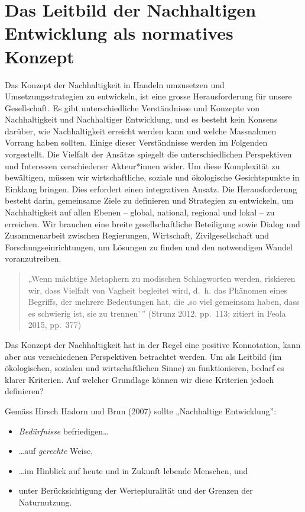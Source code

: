 \documentclass[
  nswissgerman,
  a4paper,
  openany]{book}
\providecommand{\tightlist}{%
  \setlength{\itemsep}{0pt}\setlength{\parskip}{0pt}}
\begin{document}
\section{Das Leitbild der Nachhaltigen Entwicklung als normatives
Konzept}\label{das-leitbild-der-nachhaltigen-entwicklung-als-normatives-konzept}

Das Konzept der Nachhaltigkeit in Handeln umzusetzen und
Umsetzungsstrategien zu entwickeln, ist eine grosse Herausforderung für
unsere Gesellschaft. Es gibt unterschiedliche Verständnisse und Konzepte
von Nachhaltigkeit und Nachhaltiger Entwicklung, und es besteht kein
Konsens darüber, wie Nachhaltigkeit erreicht werden kann und welche
Massnahmen Vorrang haben sollten. Einige dieser Verständnisse werden im
Folgenden vorgestellt. Die Vielfalt der Ansätze spiegelt die
unterschiedlichen Perspektiven und Interessen verschiedener Akteur*innen
wider. Um diese Komplexität zu bewältigen, müssen wir wirtschaftliche,
soziale und ökologische Gesichtspunkte in Einklang bringen. Dies
erfordert einen integrativen Ansatz. Die Herausforderung besteht darin,
gemeinsame Ziele zu definieren und Strategien zu entwickeln, um
Nachhaltigkeit auf allen Ebenen -- global, national, regional und lokal
-- zu erreichen. Wir brauchen eine breite gesellschaftliche Beteiligung
sowie Dialog und Zusammenarbeit zwischen Regierungen, Wirtschaft,
Zivilgesellschaft und Forschungseinrichtungen, um Lösungen zu finden und
den notwendigen Wandel voranzutreiben.

\begin{quote}
„Wenn mächtige Metaphern zu modischen Schlagworten werden, riskieren
wir, dass Vielfalt von Vagheit begleitet wird, d.~h. das Phänomen eines
Begriffs, der mehrere Bedeutungen hat, die ‚so viel gemeinsam haben,
dass es schwierig ist, sie zu trennen'\,'' (Strunz 2012, pp.~113;
zitiert in Feola 2015, pp.~377)
\end{quote}

Das Konzept der Nachhaltigkeit hat in der Regel eine positive
Konnotation, kann aber aus verschiedenen Perspektiven betrachtet werden.
Um als Leitbild (im ökologischen, sozialen und wirtschaftlichen Sinne)
zu funktionieren, bedarf es klarer Kriterien. Auf welcher Grundlage
können wir diese Kriterien jedoch definieren?

Gemäss Hirsch Hadorn und Brun (2007) sollte „Nachhaltige Entwicklung'':

\begin{itemize}
\tightlist
\item
  \emph{Bedürfnisse} befriedigen\ldots{}
\item
  \ldots auf \emph{gerechte} Weise,
\item
  \ldots im Hinblick auf heute und in Zukunft lebende Menschen, und
\item
  unter Berücksichtigung der Wertepluralität und der Grenzen der
  Naturnutzung.
\end{itemize}
\end{document}
